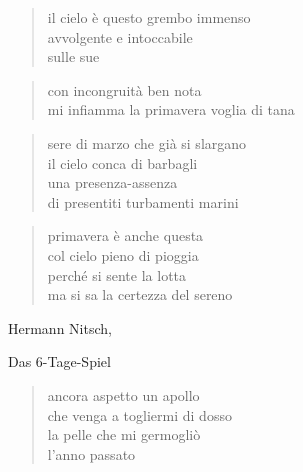 \clearpage


	\begin{verse}
		il cielo è questo grembo immenso\\
		avvolgente e intoccabile\\
		sulle sue
	\end{verse}

	\begin{verse}
		con incongruità ben nota\\
		mi infiamma la primavera voglia di tana
	\end{verse}

\clearpage


	\begin{verse}
		sere di marzo che già si slargano\\
		il cielo conca di barbagli\\
		una presenza-assenza\\
		di presentiti turbamenti marini
	\end{verse}

\clearpage


	\begin{verse}
                primavera è anche questa\\
                col cielo pieno di pioggia\\
                perché si sente la lotta\\
                ma si sa la certezza del sereno
	\end{verse}

\clearpage


\begin{artItem}
	Hermann Nitsch, \begin{otherlanguage}{german}%
		Das 6-Tage-Spiel%
	\end{otherlanguage}
\end{artItem}

	\begin{verse}
		ancora aspetto un apollo\\
		che venga a togliermi di dosso\\
		la pelle che mi germogliò\\
		l'anno passato
	\end{verse}

\clearpage



